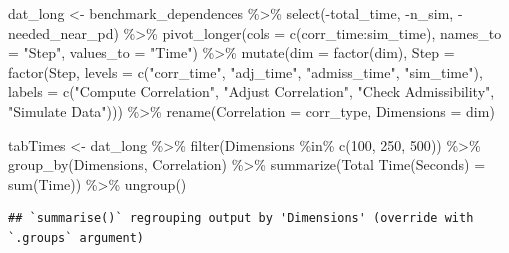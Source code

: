 \documentclass{article}
\newenvironment{Shaded}{\begin{snugshade}}{\end{snugshade}}
\newcommand{\AttributeTok}[1]{\textcolor[rgb]{0.77,0.63,0.00}{#1}}
\newcommand{\DecValTok}[1]{\textcolor[rgb]{0.00,0.00,0.81}{#1}}
\newcommand{\FunctionTok}[1]{\textcolor[rgb]{0.00,0.00,0.00}{#1}}
\newcommand{\NormalTok}[1]{#1}
\newcommand{\OtherTok}[1]{\textcolor[rgb]{0.56,0.35,0.01}{#1}}
\newcommand{\SpecialCharTok}[1]{\textcolor[rgb]{0.00,0.00,0.00}{#1}}
\newcommand{\StringTok}[1]{\textcolor[rgb]{0.31,0.60,0.02}{#1}}
\begin{document}
\begin{Shaded}
\begin{Highlighting}[]
\NormalTok{dat\_long }\OtherTok{\textless{}{-}}\NormalTok{ benchmark\_dependences }\SpecialCharTok{\%\textgreater{}\%}
  \FunctionTok{select}\NormalTok{(}\SpecialCharTok{{-}}\NormalTok{total\_time, }\SpecialCharTok{{-}}\NormalTok{n\_sim, }\SpecialCharTok{{-}}\NormalTok{needed\_near\_pd) }\SpecialCharTok{\%\textgreater{}\%}
  \FunctionTok{pivot\_longer}\NormalTok{(}\AttributeTok{cols =} \FunctionTok{c}\NormalTok{(corr\_time}\SpecialCharTok{:}\NormalTok{sim\_time), }\AttributeTok{names\_to =} \StringTok{"Step"}\NormalTok{, }\AttributeTok{values\_to =} \StringTok{"Time"}\NormalTok{) }\SpecialCharTok{\%\textgreater{}\%}
  \FunctionTok{mutate}\NormalTok{(}\AttributeTok{dim =} \FunctionTok{factor}\NormalTok{(dim),}
         \AttributeTok{Step =} \FunctionTok{factor}\NormalTok{(Step,}
                       \AttributeTok{levels =} \FunctionTok{c}\NormalTok{(}\StringTok{"corr\_time"}\NormalTok{, }\StringTok{"adj\_time"}\NormalTok{, }\StringTok{"admiss\_time"}\NormalTok{, }\StringTok{"sim\_time"}\NormalTok{),}
                       \AttributeTok{labels =} \FunctionTok{c}\NormalTok{(}\StringTok{"Compute Correlation"}\NormalTok{,}
                                  \StringTok{"Adjust Correlation"}\NormalTok{,}
                                  \StringTok{"Check Admissibility"}\NormalTok{,}
                                  \StringTok{"Simulate Data"}\NormalTok{))) }\SpecialCharTok{\%\textgreater{}\%}
    \FunctionTok{rename}\NormalTok{(}\AttributeTok{Correlation =}\NormalTok{ corr\_type, }\AttributeTok{Dimensions =}\NormalTok{ dim)}

\NormalTok{tabTimes  }\OtherTok{\textless{}{-}}\NormalTok{ dat\_long }\SpecialCharTok{\%\textgreater{}\%}
    \FunctionTok{filter}\NormalTok{(Dimensions }\SpecialCharTok{\%in\%} \FunctionTok{c}\NormalTok{(}\DecValTok{100}\NormalTok{, }\DecValTok{250}\NormalTok{, }\DecValTok{500}\NormalTok{)) }\SpecialCharTok{\%\textgreater{}\%}
    \FunctionTok{group\_by}\NormalTok{(Dimensions, Correlation) }\SpecialCharTok{\%\textgreater{}\%}
    \FunctionTok{summarize}\NormalTok{(}\StringTok{\textquotesingle{}Total Time(Seconds)\textquotesingle{}} \OtherTok{=} \FunctionTok{sum}\NormalTok{(Time)) }\SpecialCharTok{\%\textgreater{}\%}
    \FunctionTok{ungroup}\NormalTok{()}
\end{Highlighting}
\end{Shaded}

\begin{verbatim}
## `summarise()` regrouping output by 'Dimensions' (override with `.groups` argument)
\end{verbatim}
\end{document}
